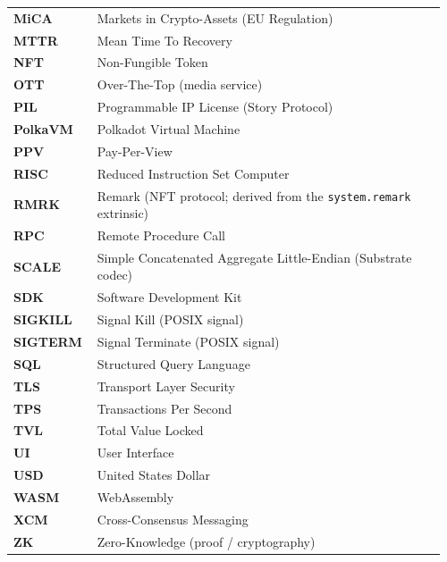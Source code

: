 \begin{longtable}{@{}L{0.18\linewidth} L{0.78\linewidth}@{}}
\textbf{MiCA} & Markets in Crypto-Assets (EU Regulation) \\
\textbf{MTTR} & Mean Time To Recovery \\
\textbf{NFT} & Non-Fungible Token \\
\textbf{OTT} & Over-The-Top (media service) \\
\textbf{PIL} & Programmable IP License (Story Protocol) \\
\textbf{PolkaVM} & Polkadot Virtual Machine \\
\textbf{PPV} & Pay-Per-View \\
\textbf{RISC} & Reduced Instruction Set Computer \\
\textbf{RMRK} & Remark (NFT protocol; derived from the \texttt{system.remark} extrinsic) \\
\textbf{RPC} & Remote Procedure Call \\
\textbf{SCALE} & Simple Concatenated Aggregate Little-Endian (Substrate codec) \\
\textbf{SDK} & Software Development Kit \\
\textbf{SIGKILL} & Signal Kill (POSIX signal) \\
\textbf{SIGTERM} & Signal Terminate (POSIX signal) \\
\textbf{SQL} & Structured Query Language \\
\textbf{TLS} & Transport Layer Security \\
\textbf{TPS} & Transactions Per Second \\
\textbf{TVL} & Total Value Locked \\
\textbf{UI} & User Interface \\
\textbf{USD} & United States Dollar \\
\textbf{WASM} & WebAssembly \\
\textbf{XCM} & Cross-Consensus Messaging \\
\textbf{ZK} & Zero-Knowledge (proof / cryptography) \\
\end{longtable}
